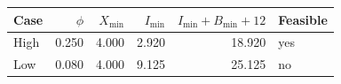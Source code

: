 \begin{tabular}{lrrrrl}
\toprule
Case & $\phi$ & $X_{\min}$ & $I_{\min}$ & $I_{\min}+B_{\min}+12$ & Feasible \\
\midrule
High & 0.250 & 4.000 & 2.920 & 18.920 & yes \\
Low & 0.080 & 4.000 & 9.125 & 25.125 & no \\
\bottomrule
\end{tabular}
